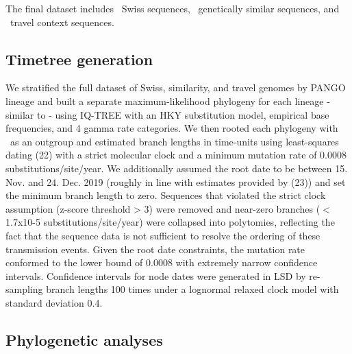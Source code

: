 \documentclass[9pt,twocolumn,twoside,lineno]{pnas-new}
\begin{document}
The final dataset includes \nswissseqs\ Swiss sequences, \nsimseqs\ genetically similar sequences, and \ntravelseqs\ travel context sequences.

\subsection{Timetree generation}
We stratified the full dataset of Swiss, similarity, and travel genomes by PANGO lineage and built a separate maximum-likelihood phylogeny for each lineage - similar to \cite{DuPlessis2020} - using IQ-TREE \cite{Nguyen2014} with an HKY substitution model, empirical base frequencies, and 4 gamma rate categories. We then rooted each phylogeny with \outgroupisl\ as an outgroup and estimated branch lengths in time-units using least-squares dating (22) with a strict molecular clock and a minimum mutation rate of 0.0008 substitutions/site/year. We additionally assumed the root date to be between 15. Nov. and 24. Dec. 2019 (roughly in line with estimates provided by (23)) and set the minimum branch length to zero. Sequences that violated the strict clock assumption (z-score threshold > 3) were removed and near-zero branches ($<$1.7x10-5 substitutions/site/year) were collapsed into polytomies, reflecting the fact that the sequence data is not sufficient to resolve the ordering of these transmission events. Given the root date constraints, the mutation rate conformed to the lower bound of 0.0008 with extremely narrow confidence intervals. Confidence intervals for node dates were generated in LSD by re- sampling branch lengths 100 times under a lognormal relaxed clock model with standard deviation 0.4.

\subsection{Phylogenetic analyses}
\end{document}
